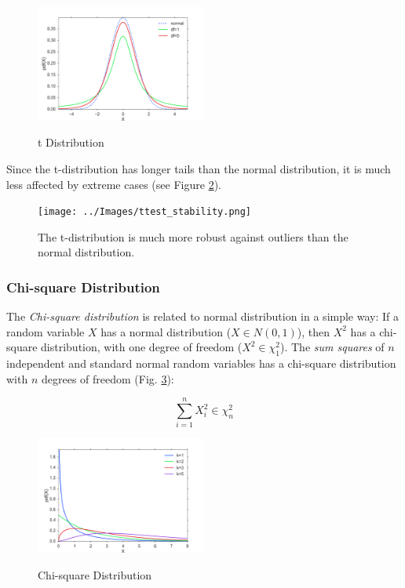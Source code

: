 \begin{figure}
  \centering
  \includegraphics[width=0.5\textwidth]{../Images/dist_t.png}\\
  \caption{t Distribution}\label{fig:t}
\end{figure}

Since the t-distribution has longer tails than the normal distribution, it is much less affected by extreme cases (see Figure \ref{fig:ttest_stability}).

\begin{figure}
  \centering
  \texttt{[image: ../Images/ttest\_stability.png]}\\
  \caption{The t-distribution is much more robust against outliers than the normal distribution.}\label{fig:ttest_stability}
\end{figure}


\subsubsection{Chi-square Distribution}

The \emph{Chi-square distribution} is related to normal distribution in a simple way: If a random variable $X$ has a normal distribution ($X \in N(0,1)$), then $X^2$ has a chi-square distribution, with one degree of freedom ($X^2 \in \chi_{1}^2$). The \emph{sum squares }of $n$ independent and standard normal random variables has a chi-square distribution with $n$ degrees of freedom (Fig. \ref{fig:chi2}):

\begin{equation}
    \sum\limits_{i = 1}^n {X_i^2} \in \chi_{n}^2
\end{equation}


\begin{figure}
  \centering
  \includegraphics[width=0.5\textwidth]{../Images/dist_chi2.png}\\
  \caption{Chi-square Distribution}
  \label{fig:chi2}
\end{figure}

